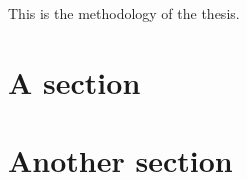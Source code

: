This is the methodology of the thesis.

\lipsum[1]

\section{A section}
\lipsum[2]

\section{Another section}
\lipsum[3]